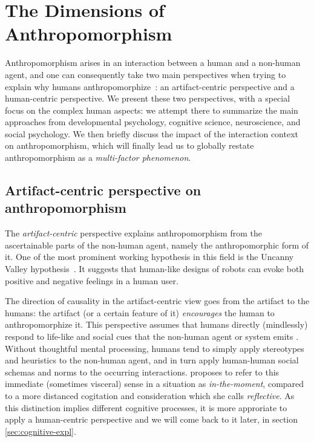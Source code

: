 \documentclass{frontiersSCNS} %
\begin{document}
\section{The Dimensions of Anthropomorphism}
\label{sec:anthropomorphism}

Anthropomorphism arises in an interaction between a human and a non-human agent,
and one can consequently take two main perspectives when trying to explain why
humans anthropomorphize~\citep{lee_human_2005}: an artifact-centric perspective
and a human-centric perspective. We present these two perspectives, with a
special focus on the complex human aspects: we attempt there to summarize the
main approaches from developmental psychology, cognitive science, neuroscience,
and social psychology. We then briefly discuss the impact of the interaction
context on anthropomorphism, which will finally lead us to globally restate
anthropomorphism as a \emph{multi-factor phenomenon}.

%
%
%
%
%
%


\subsection{Artifact-centric perspective on anthropomorphism}

The \emph{artifact-centric} perspective explains anthropomorphism from the
ascertainable parts of the non-human agent, namely the anthropomorphic form of
it. One of the most prominent working hypothesis in this field is the Uncanny
Valley hypothesis~\citep{mori_uncanny_1970}. It suggests that human-like designs
of robots can evoke both positive and negative feelings in a human user.

The direction of causality in the artifact-centric view goes from the artifact
to the humans: the artifact (or a certain feature of it) \emph{encourages} the
human to anthropomorphize it.  This perspective assumes that humans directly
(mindlessly) respond to life-like and social cues that the non-human agent or
system emits \citep{nass_machines_2000}. Without thoughtful mental processing,
humans tend to simply apply stereotypes and heuristics to the non-human agent,
and in turn apply human-human social schemas and norms to the occurring
interactions.  \cite{takayama_perspectives_2012} proposes to refer to this
immediate (sometimes visceral) sense in a situation as \textit{in-the-moment},
compared to a more distanced cogitation and consideration which she calls
\textit{reflective}. As this distinction implies different cognitive processes,
it is more approriate to apply a human-centric perspective and we will come
back to it later, in section \ref{sec:cognitive-expl}.
\end{document}
